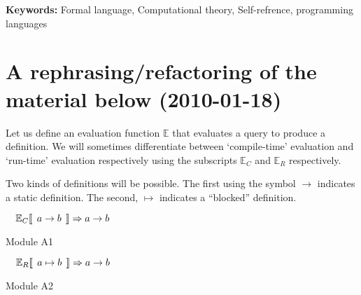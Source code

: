 \documentclass[11pt]{article}
\begin{document}
\begin{abstract}

\end{abstract}

\textbf{Keywords:} Formal language, Computational theory, Self-refrence, programming languages

\section{A rephrasing/refactoring of the material below (2010-01-18)}

Let us define an evaluation function $\mathbb{E}$ that evaluates a query to produce a definition. 
We will sometimes differentiate between `compile-time' evaluation and `run-time' evaluation respectively using the subscripts $\mathbb{E}_{C}$ and $\mathbb{E}_{R}$ respectively.

Two kinds of definitions will be possible. The first using the symbol $\rightarrow$ indicates a static definition. The second, $\mapsto$ indicates a ``blocked'' definition.

 


\begin{example}[H]
$\hspace*{1em} \mathbb{E}_{C}\llbracket \:\: a \rightarrow b \:\: \rrbracket \Rightarrow a \rightarrow b$
\caption{Module A1}
\end{example}


\begin{example}[H]
$\hspace*{1em} \mathbb{E}_{R}\llbracket \:\: a \mapsto b \:\: \rrbracket \Rightarrow a \rightarrow b$
\caption{Module A2}
\end{example}
\end{document}
